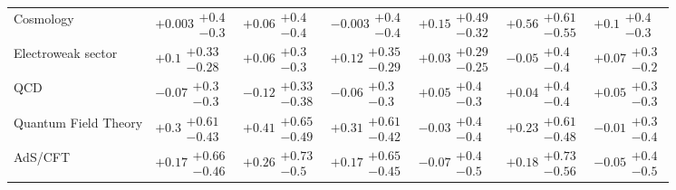 \begin{table}[H]
\begin{tabular}{lllllll}
Cosmology & $+0.003\substack{+0.4 \\ -0.3}$ & $+0.06\substack{+0.4 \\ -0.4}$ & $-0.003\substack{+0.4 \\ -0.4}$ & $+0.15\substack{+0.49 \\ -0.32}$ & $\bm{+0.56}\substack{+0.61 \\ -0.55}$ & $+0.1\substack{+0.4 \\ -0.3}$ \\
Electroweak sector & $+0.1\substack{+0.33 \\ -0.28}$ & $+0.06\substack{+0.3 \\ -0.3}$ & $+0.12\substack{+0.35 \\ -0.29}$ & $+0.03\substack{+0.29 \\ -0.25}$ & $-0.05\substack{+0.4 \\ -0.4}$ & $+0.07\substack{+0.3 \\ -0.2}$ \\
QCD & $-0.07\substack{+0.3 \\ -0.3}$ & $-0.12\substack{+0.33 \\ -0.38}$ & $-0.06\substack{+0.3 \\ -0.3}$ & $+0.05\substack{+0.4 \\ -0.3}$ & $+0.04\substack{+0.4 \\ -0.4}$ & $+0.05\substack{+0.3 \\ -0.3}$ \\
Quantum Field Theory & $+0.3\substack{+0.61 \\ -0.43}$ & $+0.41\substack{+0.65 \\ -0.49}$ & $+0.31\substack{+0.61 \\ -0.42}$ & $-0.03\substack{+0.4 \\ -0.4}$ & $+0.23\substack{+0.61 \\ -0.48}$ & $-0.01\substack{+0.3 \\ -0.4}$ \\
AdS/CFT & $+0.17\substack{+0.66 \\ -0.46}$ & $+0.26\substack{+0.73 \\ -0.5}$ & $+0.17\substack{+0.65 \\ -0.45}$ & $-0.07\substack{+0.4 \\ -0.5}$ & $+0.18\substack{+0.73 \\ -0.56}$ & $-0.05\substack{+0.4 \\ -0.5}$ \\
\bottomrule
\end{tabular}\normalsize\renewcommand{\arraystretch}{1}
\end{table}
